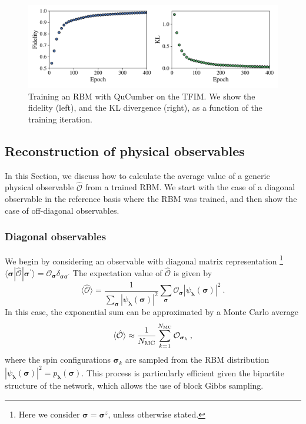 \documentclass[submission, Phys, hidelnks]{SciPost}
\begin{document}
\begin{figure}[hbt]
    \centering{}
    \includegraphics[width=\textwidth]{plots/fid_KL.pdf}
    \caption{\label{fig:KL} Training an RBM with QuCumber on the TFIM. We show the fidelity (left), and the KL divergence (right), as a function of the training iteration.}
\end{figure}

\subsection{Reconstruction of physical observables} \label{Sec:Sampling_a-Trained_RBM}
In this Section, we discuss how to calculate the average value of a generic physical observable $\hat{\mathcal{O}}$ from a trained RBM. We start with the case of a diagonal observable in the reference basis where the RBM was trained, and then show the case of off-diagonal observables.

\subsubsection{Diagonal observables}
We begin by considering an observable with diagonal matrix representation
\footnote{
Here we consider $\bm{\sigma}=\bm{\sigma}^z$, unless otherwise stated.
} 
$\langle\bm{\sigma}|\hat{\mathcal{O}}|\bm{\sigma}^{\prime}\rangle=\mathcal{O}_{\bm{\sigma}}\delta_{\bm{\sigma\sigma}^\prime}$
The expectation value of $\hat{\mathcal{O}}$ is given by
\begin{equation}
    \langle \hat{\mathcal{O}} \rangle = \frac{1}{\sum_{\bm{\sigma}} |\psi_{\bm{\lambda}}(\bm{\sigma})|^2}
    \sum_{\bm{\sigma}} \mathcal{O}_{\bm{\sigma}}|\psi_{\bm{\lambda}}(\bm{\sigma})|^2\:.
\end{equation}
In this case, the exponential sum can be approximated by a Monte Carlo average
\begin{equation}
    \langle \hat{\mathcal{O}}\rangle \approx \frac{1}{N_{\rm MC}} \sum_{k=1}^{N_{\rm MC}} \mathcal{O}_{\bm{\sigma}_k}\:,
\end{equation}
where the spin configurations $\bm{\sigma}_k$ are sampled from the RBM distribution $|\psi_{\bm{\lambda}}(\bm{\sigma})|^2=p_{\bm{\lambda}}(\bm{\sigma})$. This process is particularly efficient given the bipartite structure of the network, which allows the use of block Gibbs sampling. 
\end{document}
